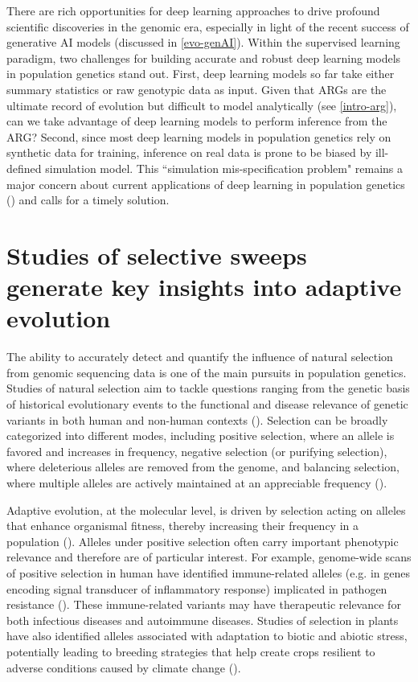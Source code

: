 There are rich opportunities for deep learning approaches to drive profound scientific discoveries in the genomic era, especially in light of the recent success of generative \ac{AI} models (discussed in \ref{evo-genAI}). Within the supervised learning paradigm, two challenges for building accurate and robust deep learning models in population genetics stand out. First, deep learning models so far take either summary statistics or raw genotypic data as input. Given that \acp{ARG} are the ultimate record of evolution but difficult to model analytically (see \ref{intro-arg}), can we take advantage of deep learning models to perform inference from the \ac{ARG}? Second, since most deep learning models in population genetics rely on synthetic data for training, inference on real data is prone to be biased by ill-defined simulation model. This ``simulation mis-specification problem" remains a major concern about current applications of deep learning in population genetics (\cite{korfmann_deep_2023}) and calls for a timely solution.

\section{Studies of selective sweeps generate key insights into adaptive evolution}

The ability to accurately detect and quantify the influence of natural selection from genomic sequencing data is one of the main pursuits in population genetics. Studies of natural selection aim to tackle questions ranging from the genetic basis of historical evolutionary events to the functional and disease relevance of genetic variants in both human and non-human contexts (\cite{karlsson2014natural,henry2014exploring}). Selection can be broadly categorized into different modes, including positive selection, where an allele is favored and increases in frequency, negative selection (or purifying selection), where deleterious alleles are removed from the genome, and balancing selection, where multiple alleles are actively maintained at an appreciable frequency (\cite{vitti2013detecting}).

Adaptive evolution, at the molecular level, is driven by selection acting on alleles that enhance organismal fitness, thereby increasing their frequency in a population (\cite{vitti2013detecting}). Alleles under positive selection often carry important phenotypic relevance and therefore are of particular interest. For example, genome-wide scans of positive selection in human have identified immune-related alleles (e.g. in genes encoding signal transducer of inflammatory response) implicated in pathogen resistance (\cite{fumagalli2011signatures}). These immune-related variants may have therapeutic relevance for both infectious diseases and autoimmune diseases. Studies of selection in plants have also identified alleles associated with adaptation to biotic and abiotic stress, potentially leading to breeding strategies that help create crops resilient to adverse conditions caused by climate change (\cite{henry2014exploring}). 

